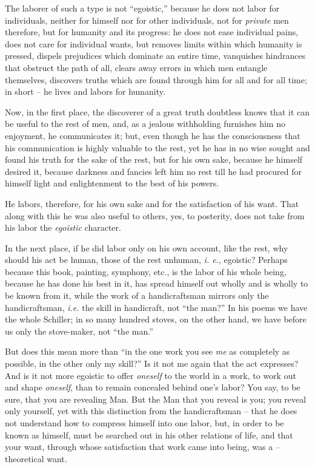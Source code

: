 \documentclass[12pt,a4paper]{book}
\begin{document}
The laborer of such a type is not ``egoistic,'' because he does not labor 
for individuals, neither for himself nor for other individuals, not for 
\textit{private} men therefore, but for humanity and its progress: he does not 
ease individual pains, does not care for individual wants, but removes limits 
within which humanity is pressed, dispels prejudices which dominate an entire 
time, vanquishes hindrances that obstruct the path of all, clears away errors 
in which men entangle themselves, discovers truths which are found through him 
for all and for all time; in short -- he lives and labors for humanity.

Now, in the first place, the discoverer of a great truth doubtless knows that 
it can be useful to the rest of men, and, as a jealous withholding furnishes 
him no enjoyment, he communicates it; but, even though he has the 
consciousness that his communication is highly valuable to the rest, yet he 
has in no wise sought and found his truth for the sake of the rest, but for 
his own sake, because he himself desired it, because darkness and fancies left 
him no rest till he had procured for himself light and enlightenment to the 
best of his powers.

He labors, therefore, for his own sake and for the satisfaction of his want. 
That along with this he was also useful to others, yes, to posterity, does not 
take from his labor the \textit{egoistic} character.

In the next place, if he did labor only on his own account, like the rest, why 
should his act be human, those of the rest unhuman, \textit{i. e.}, egoistic? 
Perhaps because this book, painting, symphony, etc., is the labor of his whole 
being, because he has done his best in it, has spread himself out wholly and 
is wholly to be known from it, while the work of a handicraftsman mirrors only 
the handicraftsman, \textit{i.e.} the skill in handicraft, not ``the man?'' 
In his poems we have the whole Schiller; in so many hundred stoves, on the 
other hand, we have before us only the stove-maker, not ``the man.''

But does this mean more than ``in the one work you see \textit{me} as 
completely as possible, in the other only my skill?'' Is it not me again that 
the act expresses? And is it not more egoistic to offer \textit{oneself} to 
the world in a work, to work out and shape \textit{oneself}, than to remain 
concealed behind one's labor? You say, to be sure, that you are revealing Man. 
But the Man that you reveal is you; you reveal only yourself, yet with this 
distinction from the handicraftsman -- that he does not understand how to 
compress himself into one labor, but, in order to be known as himself, must be 
searched out in his other relations of life, and that your want, through whose 
satisfaction that work came into being, was a -- theoretical want.
\end{document}

